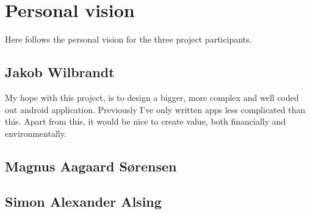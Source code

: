 
\chapter{Personal vision}
Here follows the personal vision for the three project participants.

\section{Jakob Wilbrandt}

My hope with this project, is to design a bigger, more complex and well coded out android application. Previously I've only written apps less complicated than this. Apart from this, it would be nice to create value, both financially and environmentally.


\section{Magnus Aagaard Sørensen}


\section{Simon Alexander Alsing}


